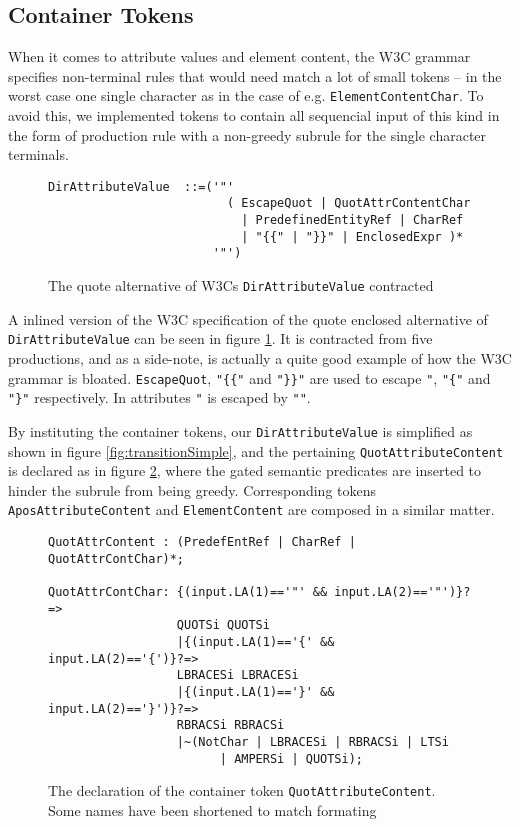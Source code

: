 \subsection{Container Tokens}
\label{sect:rewriteGrammar:containerTokens}
When it comes to attribute values and element content, the W3C grammar specifies non-terminal rules that would need match a lot of small tokens -- in the worst case one single character as in the case of e.g. \verb!ElementContentChar!. To avoid this, we implemented tokens to contain all sequencial input of this kind in the form of production rule with a non-greedy subrule for the single character terminals. 

\begin{figure}[h!]
\begin{verbatim}
DirAttributeValue  ::=('"' 
                         ( EscapeQuot | QuotAttrContentChar
                           | PredefinedEntityRef | CharRef 
                           | "{{" | "}}" | EnclosedExpr )* 
                       '"')
\end{verbatim}
\caption[W3Cs \texttt{DirAttributeValue} contracted]{The quote alternative of W3Cs \texttt{DirAttributeValue} contracted}
\label{fig:contractAttribute}
\end{figure}

A inlined version of the W3C specification of the quote enclosed alternative of \verb!DirAttributeValue! can be seen in figure \ref{fig:contractAttribute}. It is contracted from five productions, and as a side-note, is actually a quite good example of how the W3C grammar is bloated. \verb!EscapeQuot!, \verb!"{{"! and \verb!"}}"! are used to escape \verb!"!, \verb!"{"! and \verb!"}"! respectively. In attributes \verb!"! is escaped by \verb!""!. 

By instituting the container tokens, our \verb!DirAttributeValue! is simplified as shown in figure \ref{fig:transitionSimple}, and the pertaining \verb!QuotAttributeContent! is declared as in figure \ref{fig:containerToken}, where the gated semantic predicates are inserted to hinder the subrule from being greedy. Corresponding tokens \verb!AposAttributeContent! and \verb!ElementContent! are composed in a similar matter.

\begin{figure}[h!]
\begin{verbatim}
QuotAttrContent : (PredefEntRef | CharRef | QuotAttrContChar)*;

QuotAttrContChar: {(input.LA(1)=='"' && input.LA(2)=='"')}?=> 
                  QUOTSi QUOTSi
                  |{(input.LA(1)=='{' && input.LA(2)=='{')}?=> 
                  LBRACESi LBRACESi 
                  |{(input.LA(1)=='}' && input.LA(2)=='}')}?=> 
                  RBRACSi RBRACSi 
                  |~(NotChar | LBRACESi | RBRACSi | LTSi 
                        | AMPERSi | QUOTSi);
\end{verbatim}
\caption[Example of container token]{The declaration of the container token \texttt{QuotAttributeContent}. Some names have been shortened to match formating}
\label{fig:containerToken}
\end{figure}